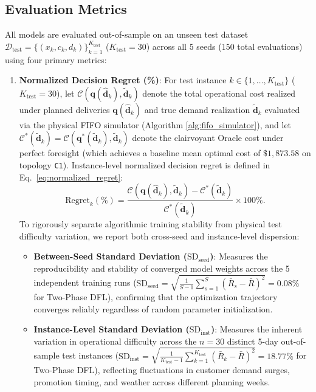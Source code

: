 \documentclass[11pt,a4paper]{article}
\theoremstyle{definition}
\theoremstyle{remark}
\begin{document}
\subsection{Evaluation Metrics}
\label{subsec:metrics}
All models are evaluated out-of-sample on an unseen test dataset $\mathcal{D}_{\text{test}} = \{(x_k, c_k, d_k)\}_{k=1}^{K_{\text{test}}}$ ($K_{\text{test}} = 30$) across all 5 seeds ($150$ total evaluations) using four primary metrics:
\begin{enumerate}[leftmargin=*]
    \item \textbf{Normalized Decision Regret (\%)}:
    For test instance $k \in \{1, \dots, K_{\text{test}}\}$ ($K_{\text{test}} = 30$), let $\mathcal{C}(\mathbf{q}(\hat{\mathbf{d}}_k), \tilde{\mathbf{d}}_k)$ denote the total operational cost realized under planned deliveries $\mathbf{q}(\hat{\mathbf{d}}_k)$ and true demand realization $\tilde{\mathbf{d}}_k$ evaluated via the physical FIFO simulator (Algorithm \ref{alg:fifo_simulator}), and let $\mathcal{C}^*(\tilde{\mathbf{d}}_k) = \mathcal{C}(\mathbf{q}^*(\tilde{\mathbf{d}}_k), \tilde{\mathbf{d}}_k)$ denote the clairvoyant Oracle cost under perfect foresight (which achieves a baseline mean optimal cost of $\$1,873.58$ on topology \texttt{C1}). Instance-level normalized decision regret is defined in Eq.~\eqref{eq:normalized_regret}:
    \begin{equation}
        \text{Regret}_k(\%) = \frac{\mathcal{C}(\mathbf{q}(\hat{\mathbf{d}}_k), \tilde{\mathbf{d}}_k) - \mathcal{C}^*(\tilde{\mathbf{d}}_k)}{\mathcal{C}^*(\tilde{\mathbf{d}}_k)} \times 100\%. \label{eq:normalized_regret}
    \end{equation}
    To rigorously separate algorithmic training stability from physical test difficulty variation, we report both cross-seed and instance-level dispersion:
    \begin{itemize}
        \item \textbf{Between-Seed Standard Deviation ($\text{SD}_{\text{seed}}$)}: Measures the reproducibility and stability of converged model weights across the 5 independent training runs ($\text{SD}_{\text{seed}} = \sqrt{\frac{1}{S-1}\sum_{s=1}^S (\bar{R}_s - \bar{R})^2} = 0.08\%$ for Two-Phase DFL), confirming that the optimization trajectory converges reliably regardless of random parameter initialization.
        \item \textbf{Instance-Level Standard Deviation ($\text{SD}_{\text{inst}}$)}: Measures the inherent variation in operational difficulty across the $n = 30$ distinct 5-day out-of-sample test instances ($\text{SD}_{\text{inst}} = \sqrt{\frac{1}{K_{\text{test}}-1}\sum_{k=1}^{K_{\text{test}}} (\bar{R}_k - \bar{R})^2} = 18.77\%$ for Two-Phase DFL), reflecting fluctuations in customer demand surges, promotion timing, and weather across different planning weeks.

\end{itemize}
\end{enumerate}
\end{document}
